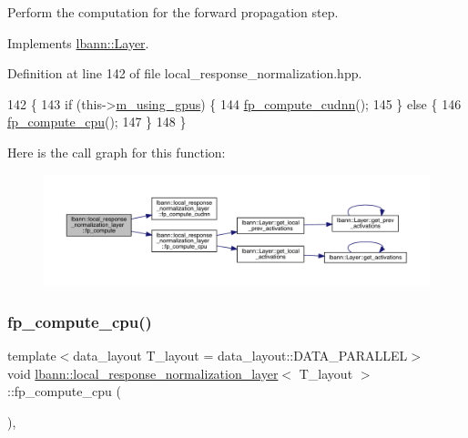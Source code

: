 Perform the computation for the forward propagation step. 

Implements \hyperlink{classlbann_1_1Layer_a523319dd1bd87a0612afa1912bb5aad7}{lbann\+::\+Layer}.



Definition at line 142 of file local\+\_\+response\+\_\+normalization.\+hpp.


\begin{DoxyCode}
142                              \{
143     \textcolor{keywordflow}{if} (this->\hyperlink{classlbann_1_1Layer_af7881cb5eff5207c15fa835d65462e8f}{m\_using\_gpus}) \{
144       \hyperlink{classlbann_1_1local__response__normalization__layer_a715b08cfc4bfed730a066f6d9cedef86}{fp\_compute\_cudnn}();
145     \} \textcolor{keywordflow}{else} \{
146       \hyperlink{classlbann_1_1local__response__normalization__layer_a79c72491b5b74b64d2b10ac2636cddce}{fp\_compute\_cpu}();
147     \}
148   \}
\end{DoxyCode}
Here is the call graph for this function\+:\nopagebreak
\begin{figure}[H]
\begin{center}
\leavevmode
\includegraphics[width=350pt]{classlbann_1_1local__response__normalization__layer_ac7b2ce4970eb7163685fb0a4a69328fc_cgraph}
\end{center}
\end{figure}
\mbox{\label{classlbann_1_1local__response__normalization__layer_a79c72491b5b74b64d2b10ac2636cddce}} 
\subsubsection{\texorpdfstring{fp\+\_\+compute\+\_\+cpu()}{fp\_compute\_cpu()}}
{\footnotesize\ttfamily template$<$data\+\_\+layout T\+\_\+layout = data\+\_\+layout\+::\+D\+A\+T\+A\+\_\+\+P\+A\+R\+A\+L\+L\+EL$>$ \\
void \hyperlink{classlbann_1_1local__response__normalization__layer}{lbann\+::local\+\_\+response\+\_\+normalization\+\_\+layer}$<$ T\+\_\+layout $>$\+::fp\+\_\+compute\+\_\+cpu (\begin{DoxyParamCaption}{ }\end{DoxyParamCaption})\hspace{0.3cm}{\ttfamily [inline]}, {\ttfamily [private]}}



